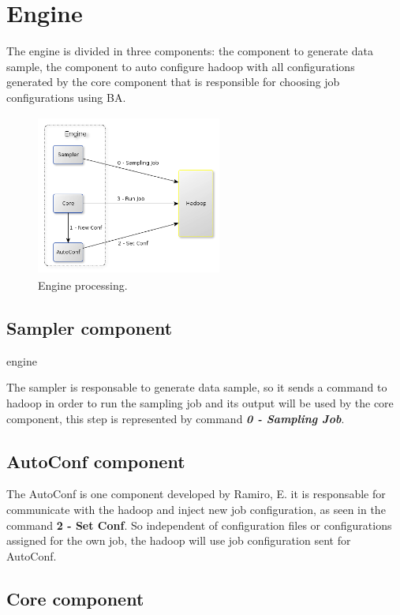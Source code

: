 \section{Engine}

The engine is divided in three components: the component to generate
data sample, the component to auto configure hadoop with all configurations generated
by the core component that is responsible for choosing job configurations using BA.

\begin{figure}[htbp]
	\centering
	\includegraphics[width=230px,height=200px]{img/engine.png}
	\caption{Engine processing.}\label{fig:engine}
\end{figure}

\subsection{Sampler component}engine

The sampler is responsable to generate data sample, so it sends a command to hadoop
in order to run the sampling job and its output will be used by the core component,
this step is represented by command {\it \bf 0 - Sampling Job}.

\subsection{AutoConf component}

The AutoConf is one component developed by Ramiro, E. %
it is responsable for communicate with the hadoop and inject new job configuration,
as seen in the command {\bf 2 - Set Conf}. So independent of configuration files
or configurations assigned for the own job, the hadoop will use job configuration
sent for AutoConf.

\subsection{Core component}

